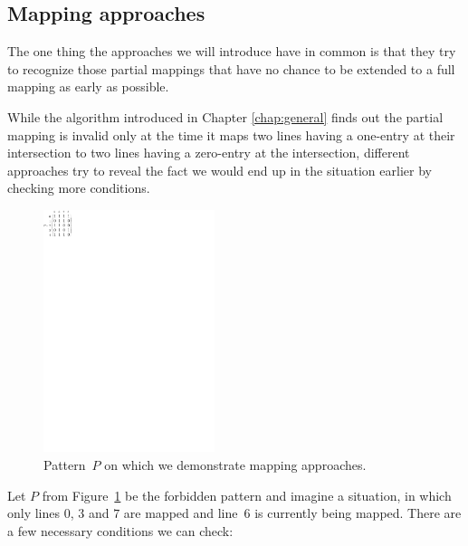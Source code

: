 \subsection{Mapping approaches}
\label{sect:approaches}
The one thing the approaches we will introduce have in common is that they try to recognize those partial mappings that have no chance to be extended to a full mapping as early as possible.

While the algorithm introduced in Chapter \ref{chap:general} finds out the partial mapping is invalid only at the time it maps two lines having a one-entry at their intersection to two lines having a zero-entry at the intersection, different approaches try to reveal the fact we would end up in the situation earlier by checking more conditions.
\begin{figure}[h!]
\centering
\includegraphics[width=50mm]{../img/approaches.pdf}
\caption{Pattern~$P$ on which we demonstrate mapping approaches.}
\label{approaches}
\end{figure}
Let $P$ from Figure~\ref{approaches} be the forbidden pattern and imagine a situation, in which only lines $0$, $3$ and $7$ are mapped and line~$6$ is currently being mapped. There are a few necessary conditions we can check:
